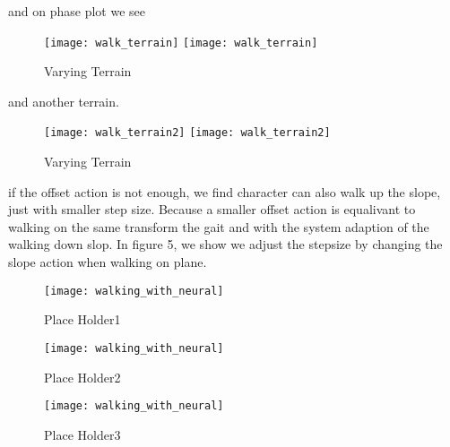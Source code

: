 and on phase plot we see

\begin{figure}[!htbp]
  \begin{center}
    \leavevmode
    \ifpdf
      \texttt{[image: walk\_terrain]}
    \else
      \texttt{[image: walk\_terrain]}
    \fi
    \caption{Varying Terrain}
    \label{fig:diffterrainphase}
\end{center}
\end{figure}

and another terrain.
\begin{figure}[!htbp]
  \begin{center}
    \leavevmode
    \ifpdf
      \texttt{[image: walk\_terrain2]}
    \else
      \texttt{[image: walk\_terrain2]}
    \fi
    \caption{Varying Terrain}
    \label{fig:diffterrainphase}
\end{center}
\end{figure}


if the offset action is not enough, we find character can also walk up the slope, just with smaller step size.
Because a  smaller offset action is equalivant to walking on the same transform the gait and with the system adaption of the walking down slop.
In figure 5, we show we adjust the stepsize by changing the slope action when walking on plane.

\begin{figure}[!htbp]
  \begin{center}
      \texttt{[image: walking\_with\_neural]}
    \caption{Place Holder1}
    \label{fig:ssp1}
\end{center}
\end{figure}

\begin{figure}[!htbp]
  \begin{center}
      \texttt{[image: walking\_with\_neural]}
    \caption{Place Holder2}
    \label{fig:ssp2}
\end{center}
\end{figure}

\begin{figure}[!htbp]
  \begin{center}
      \texttt{[image: walking\_with\_neural]}
    \caption{Place Holder3}
    \label{fig:ssp3}
\end{center}
\end{figure}



